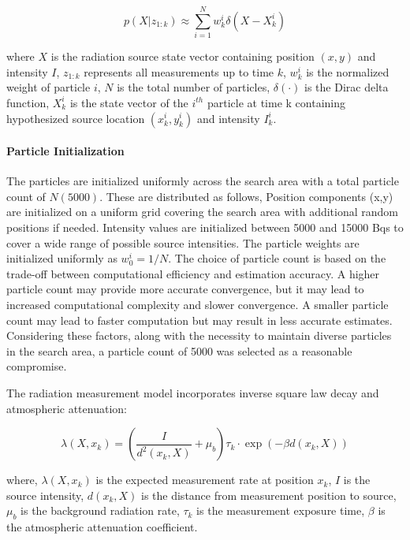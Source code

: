 \documentclass[../report.tex]{subfiles}
\begin{document}
    \begin{equation}
    p(X|z_{1:k}) \approx \sum_{i=1}^N w_k^i \delta(X - X_k^i)
    \end{equation}

    where $X$ is the radiation source state vector containing position $(x,y)$ and intensity $I$, $z_{1:k}$ represents all measurements up to time $k$, $w_k^i$ is the normalized weight of 
    particle $i$, $N$ is the total number of particles, $\delta(\cdot)$ is the Dirac delta function, $X_k^i$ is the state vector of the $i^{th}$ particle at time k containing
    hypothesized source location $(x_k^i, y_k^i)$ and intensity $I_k^i$. 

    \paragraph{Particle Initialization}
    The particles are initialized uniformly across the search area with a total particle count of $N (5000)$. These are distributed as follows, Position components (x,y) are initialized on a 
    uniform grid covering the search area with additional random positions if needed. Intensity values are initialized between 5000 and 15000 Bqs to cover a wide range of 
    possible source intensities. The particle weights are initialized uniformly as $w_0^i = 1/N$. The choice of particle count is based on the trade-off 
    between computational efficiency and estimation accuracy. A higher particle count may provide more accurate convergence, but it may lead to increased 
    computational complexity and slower convergence. A smaller particle count may lead to faster computation but may result in less accurate estimates. Considering 
    these factors, along with the necessity to maintain diverse particles in the search area, a particle count of 5000 was selected as a reasonable compromise.


    The radiation measurement model incorporates inverse square law decay and atmospheric attenuation:

    \begin{equation}
    \lambda(X, x_k) = \left(\frac{I}{d^2(x_k, X)} + \mu_b\right)\tau_k \cdot \exp(-\beta d(x_k, X))
    \label{eq:entropy_measurement_model}
    \end{equation}

    where, $\lambda(X, x_k)$ is the expected measurement rate at position $x_k$, $I$ is the source intensity, $d(x_k, X)$ is the distance from measurement position to source, $\mu_b$ is the 
    background radiation rate, $\tau_k$ is the measurement exposure time, $\beta$ is the atmospheric attenuation coefficient.
\end{document}
